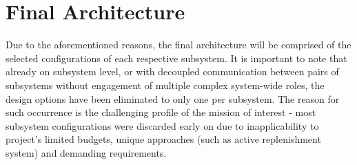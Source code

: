 








\section{Final Architecture}
\label{sec:final_arch}

Due to the aforementioned reasons, the final architecture will be comprised of the selected configurations of each respective subsystem. It is important to note that already on subsystem level, or with decoupled communication between pairs of subsystems without engagement of multiple complex system-wide roles, the design options have been eliminated to only one per subsystem. The reason for such occurrence is the challenging profile of the mission of interest - most subsystem configurations were discarded early on due to inapplicability to project's limited budgets, unique approaches (such as active replenishment system) and demanding requirements.

